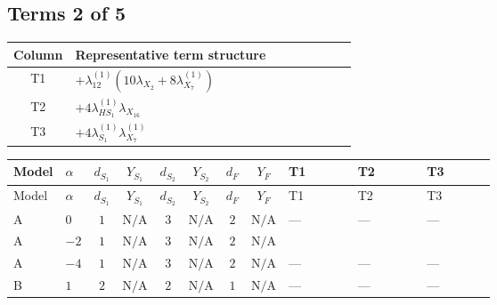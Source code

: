 \documentclass[8pt]{article}
\begin{document}
\begin{landscape}
\subsection*{Terms 2 of 5}
\begin{center}
\begin{tabular}{@{}c >{\raggedright\arraybackslash}p{0.82\linewidth}@{}}
\toprule
Column & Representative term structure \\
\midrule
T1 & \(\displaystyle +{\lambda_{12}^{(1)}} (10 {\lambda_{X_{2}}}+8 {\lambda_{X_{7}}^{(1)}})\) \\
\midrule
T2 & \(\displaystyle +4 {\lambda_{HS_1}^{(1)}} {\lambda_{X_{16}}}\) \\
\midrule
T3 & \(\displaystyle +4 {\lambda_{S_1}^{(1)}} {\lambda_{X_{7}}^{(1)}}\) \\
\midrule
\bottomrule
\end{tabular}
\end{center}
\smallskip
\tiny
\begin{longtable}{@{}llcccccc >{\raggedright\arraybackslash}p{0.21\linewidth} >{\raggedright\arraybackslash}p{0.21\linewidth} >{\raggedright\arraybackslash}p{0.21\linewidth}@{}}
\toprule
Model & $\alpha$ & $d_{S_1}$ & $Y_{S_1}$ & $d_{S_2}$ & $Y_{S_2}$ & $d_F$ & $Y_F$ & T1 & T2 & T3 \\
\midrule
\endfirsthead
\toprule
Model & $\alpha$ & $d_{S_1}$ & $Y_{S_1}$ & $d_{S_2}$ & $Y_{S_2}$ & $d_F$ & $Y_F$ & T1 & T2 & T3 \\
\midrule
\endhead
A & $0$ & $1$ & $\text{N/A}$ & $3$ & $\text{N/A}$ & $2$ & $\text{N/A}$ & --- & --- & --- \\
\midrule
A & $-2$ & $1$ & $\text{N/A}$ & $3$ & $\text{N/A}$ & $2$ & $\text{N/A}$ & \scriptsize\adjustbox{max width=\linewidth}{$\begin{gathered} +{\lambda_{12}^{(1)}} (10 {\lambda_{X_{2}}}+8 {\lambda_{X_{7}}^{(1)}})\end{gathered}$} & \scriptsize\adjustbox{max width=\linewidth}{$\begin{gathered} +4 {\lambda_{HS_1}^{(1)}} {\lambda_{X_{16}}}\end{gathered}$} & \scriptsize\adjustbox{max width=\linewidth}{$\begin{gathered} +4 {\lambda_{S_1}^{(1)}} {\lambda_{X_{7}}^{(1)}}\end{gathered}$} \\
\midrule
A & $-4$ & $1$ & $\text{N/A}$ & $3$ & $\text{N/A}$ & $2$ & $\text{N/A}$ & --- & --- & --- \\
\midrule
B & $1$ & $2$ & $\text{N/A}$ & $2$ & $\text{N/A}$ & $1$ & $\text{N/A}$ & --- & --- & --- \\

\end{longtable}
\end{landscape}
\end{document}
